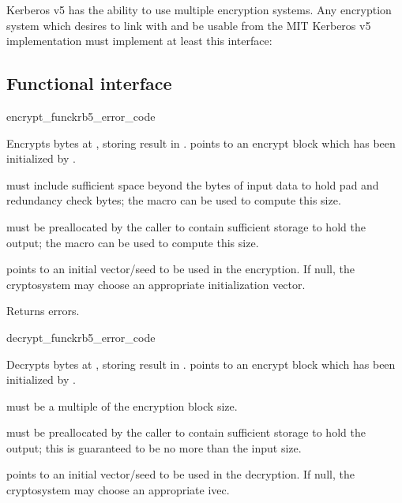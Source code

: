 Kerberos v5 has the ability to use multiple encryption systems.  Any
encryption system which desires to link with and be usable from the MIT
Kerberos v5 implementation must implement at least this interface:

\subsection{Functional interface}

\begin{funcdecl}{encrypt_func}{krb5_error_code}{\funcvoid}
\end{funcdecl}
Encrypts  bytes at , storing result in
.   points to an encrypt block which
has been initialized by .

 must include sufficient space beyond the 
bytes of input data to hold pad and redundancy check bytes; the macro
 can be used to compute this size.

 must be preallocated by the caller to contain sufficient
storage to hold the output; the macro  can
be used to compute this size.

 points to an initial vector/seed to be used in the encryption.
If null, the cryptosystem may choose an appropriate initialization vector.

Returns errors.

\begin{funcdecl}{decrypt_func}{krb5_error_code}{\funcvoid}
\end{funcdecl}
Decrypts  bytes at , storing result in
.
 points to an encrypt block which has been initialized
by .

 must be a multiple of the encryption block size.

 must be preallocated by the caller to contain sufficient
storage to hold the output; this is guaranteed to be no more than
the input size.

 points to an initial vector/seed to be used in the decryption.
If null, the cryptosystem may choose an appropriate ivec.

